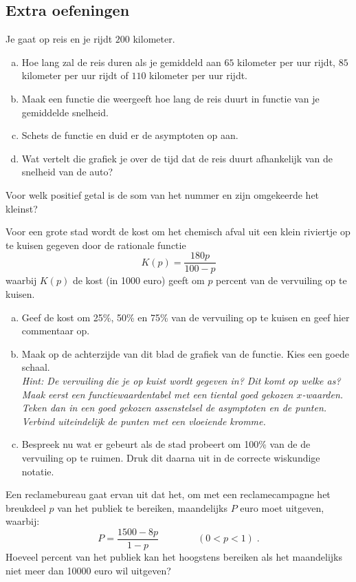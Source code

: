 \documentclass[12pt]{article}
\begin{document}
\subsection*{Extra oefeningen}

\begin{oefening}
Je gaat op reis en je rijdt $200$ kilometer.
\begin{enumerate}[(a)]
  \item Hoe lang zal de reis duren als je gemiddeld aan $65$ kilometer per uur rijdt, $85$ kilometer per uur rijdt of $110$ kilometer per uur rijdt.
  \item Maak een functie die weergeeft hoe lang de reis duurt in functie van je gemiddelde snelheid.
  \item Schets de functie en duid er de asymptoten op aan.
  \item Wat vertelt die grafiek je over de tijd dat de reis duurt afhankelijk van de snelheid van de auto?
\end{enumerate}
\end{oefening}

\begin{oefening}
Voor welk positief getal is de som van het nummer en zijn omgekeerde het kleinst?
\end{oefening}

\begin{oefening}
Voor een grote stad wordt de kost om het chemisch afval uit een klein riviertje op te kuisen gegeven door de rationale functie
$$K(p)=\frac{180p}{100-p}$$
waarbij $K(p)$ de kost (in 1000 euro) geeft om $p$ percent van de vervuiling op te kuisen.
\begin{enumerate}[(a)]
  \item Geef de kost om 25\%, 50\% en 75\% van de vervuiling op te kuisen en geef hier commentaar op.
  \item Maak op de achterzijde van dit blad de grafiek van de functie. Kies een goede schaal.\\
  {\small\em Hint: De vervuiling die je op kuist wordt gegeven in? Dit komt op welke as? Maak eerst een functiewaardentabel met een tiental goed gekozen $x$-waarden. Teken dan in een goed gekozen assenstelsel de asymptoten en de punten. Verbind uiteindelijk de punten met een vloeiende kromme.}
  \item Bespreek nu wat er gebeurt als de stad probeert om 100\% van de de vervuiling op te ruimen. Druk dit daarna uit in de correcte wiskundige notatie.
\end{enumerate}
\end{oefening}

\begin{oefening}
Een reclamebureau gaat ervan uit dat het, om met een reclamecampagne het breukdeel $p$ van het publiek te bereiken, maandelijks $P$ euro moet uitgeven, waarbij:
$$P=\frac{1500-8p}{1-p} \qquad\qquad (0<p<1)\;.$$
Hoeveel percent van het publiek kan het hoogstens bereiken als het maandelijks niet meer dan 10000 euro wil uitgeven?
\end{oefening}
\end{document}
